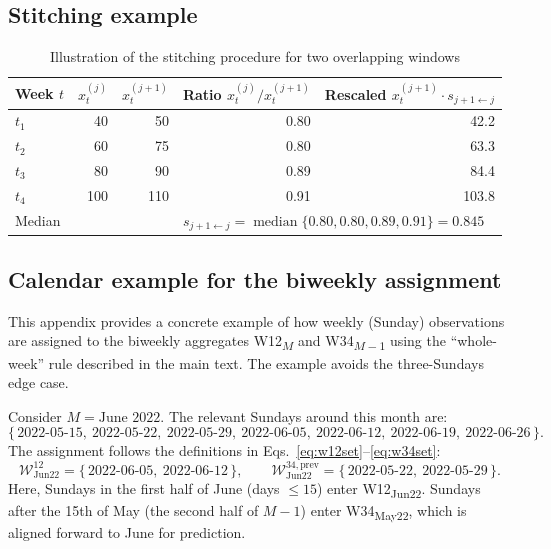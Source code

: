\documentclass[12pt,a4paper]{article}
\begin{document}
\subsection{Stitching example}
\begin{table}[H]
\centering
\caption{Illustration of the stitching procedure for two overlapping windows}
\label{tab:stitch_example}
\begin{tabular}{lrrrr}
\toprule
Week $t$ & $x^{(j)}_t$ & $x^{(j+1)}_t$ & Ratio $x^{(j)}_t / x^{(j+1)}_t$ & Rescaled $x^{(j+1)}_t \cdot s_{j+1\leftarrow j}$ \\ \midrule
$ t_1 $ & 40  & 50  & 0.80  & 42.2 \\
$ t_2 $ & 60  & 75  & 0.80  & 63.3 \\
$ t_3 $ & 80  & 90  & 0.89  & 84.4 \\
$ t_4 $ & 100 & 110 & 0.91  & 103.8 \\ \midrule
Median &     &     & \multicolumn{2}{l}{$s_{j+1\leftarrow j} = \operatorname{median}\{0.80,0.80,0.89,0.91\} = 0.845$} \\ \bottomrule
\end{tabular}
\end{table}













\subsection{Calendar example for the biweekly assignment}
\label{app:biweekly-example}

This appendix provides a concrete example of how weekly (Sunday) observations are assigned to the biweekly aggregates W12\textsubscript{$M$} and W34\textsubscript{$M-1$} using the ``whole-week'' rule described in the main text. The example avoids the three-Sundays edge case.

Consider $M=\text{June 2022}$. The relevant Sundays around this month are:
\[
\{\,\text{2022-05-15},\ \text{2022-05-22},\ \text{2022-05-29},\ \text{2022-06-05},\ \text{2022-06-12},\ \text{2022-06-19},\ \text{2022-06-26}\,\}.
\]
The assignment follows the definitions in Eqs.~\eqref{eq:w12set}--\eqref{eq:w34set}:
\[
\mathcal{W}^{12}_{\text{Jun22}}
=
\{\,\text{2022-06-05},\ \text{2022-06-12}\,\},
\qquad
\mathcal{W}^{34,\text{prev}}_{\text{Jun22}}
=
\{\,\text{2022-05-22},\ \text{2022-05-29}\,\}.
\]
Here, Sundays in the first half of June (days $\le 15$) enter W12\textsubscript{Jun22}. Sundays after the 15th of May (the second half of $M{-}1$) enter W34\textsubscript{May22}, which is aligned forward to June for prediction.
\end{document}
